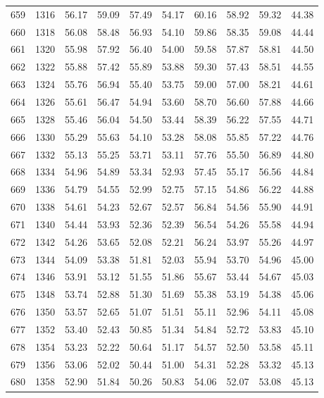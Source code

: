 \begin{longtable}{rrllllllll}
		659 & 1316 & 56.17 & 59.09 & 57.49 & 54.17 & 60.16 & 58.92 & 59.32 & 44.38 \\ 
		660 & 1318 & 56.08 & 58.48 & 56.93 & 54.10 & 59.86 & 58.35 & 59.08 & 44.44 \\ 
		661 & 1320 & 55.98 & 57.92 & 56.40 & 54.00 & 59.58 & 57.87 & 58.81 & 44.50 \\ 
		662 & 1322 & 55.88 & 57.42 & 55.89 & 53.88 & 59.30 & 57.43 & 58.51 & 44.55 \\ 
		663 & 1324 & 55.76 & 56.94 & 55.40 & 53.75 & 59.00 & 57.00 & 58.21 & 44.61 \\ 
		664 & 1326 & 55.61 & 56.47 & 54.94 & 53.60 & 58.70 & 56.60 & 57.88 & 44.66 \\ 
		665 & 1328 & 55.46 & 56.04 & 54.50 & 53.44 & 58.39 & 56.22 & 57.55 & 44.71 \\ 
		666 & 1330 & 55.29 & 55.63 & 54.10 & 53.28 & 58.08 & 55.85 & 57.22 & 44.76 \\ 
		667 & 1332 & 55.13 & 55.25 & 53.71 & 53.11 & 57.76 & 55.50 & 56.89 & 44.80 \\ 
		668 & 1334 & 54.96 & 54.89 & 53.34 & 52.93 & 57.45 & 55.17 & 56.56 & 44.84 \\ 
		669 & 1336 & 54.79 & 54.55 & 52.99 & 52.75 & 57.15 & 54.86 & 56.22 & 44.88 \\ 
		670 & 1338 & 54.61 & 54.23 & 52.67 & 52.57 & 56.84 & 54.56 & 55.90 & 44.91 \\ 
		671 & 1340 & 54.44 & 53.93 & 52.36 & 52.39 & 56.54 & 54.26 & 55.58 & 44.94 \\ 
		672 & 1342 & 54.26 & 53.65 & 52.08 & 52.21 & 56.24 & 53.97 & 55.26 & 44.97 \\ 
		673 & 1344 & 54.09 & 53.38 & 51.81 & 52.03 & 55.94 & 53.70 & 54.96 & 45.00 \\ 
		674 & 1346 & 53.91 & 53.12 & 51.55 & 51.86 & 55.67 & 53.44 & 54.67 & 45.03 \\ 
		675 & 1348 & 53.74 & 52.88 & 51.30 & 51.69 & 55.38 & 53.19 & 54.38 & 45.06 \\ 
		676 & 1350 & 53.57 & 52.65 & 51.07 & 51.51 & 55.11 & 52.96 & 54.11 & 45.08 \\ 
		677 & 1352 & 53.40 & 52.43 & 50.85 & 51.34 & 54.84 & 52.72 & 53.83 & 45.10 \\ 
		678 & 1354 & 53.23 & 52.22 & 50.64 & 51.17 & 54.57 & 52.50 & 53.58 & 45.11 \\ 
		679 & 1356 & 53.06 & 52.02 & 50.44 & 51.00 & 54.31 & 52.28 & 53.32 & 45.13 \\ 
		680 & 1358 & 52.90 & 51.84 & 50.26 & 50.83 & 54.06 & 52.07 & 53.08 & 45.13 \\ 

\end{longtable}
